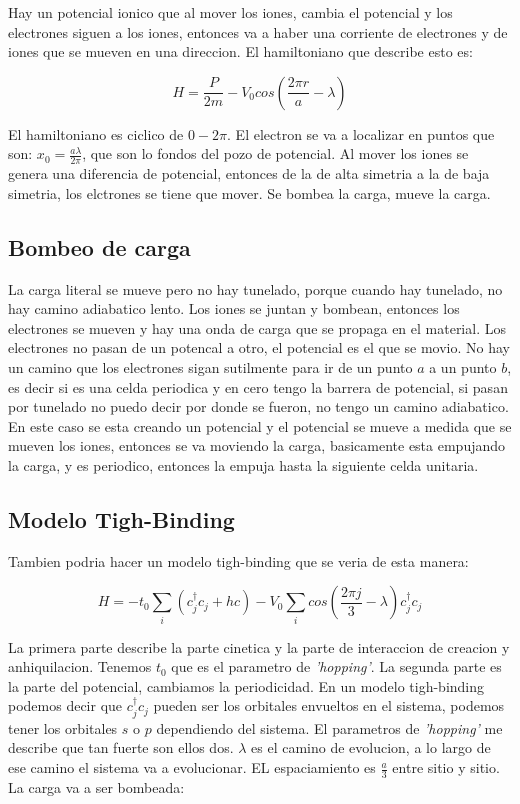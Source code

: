 \documentclass[11pt,fleqn]{book}
\begin{document}
Hay un potencial ionico que al mover los iones, cambia el potencial y los electrones siguen a los iones, entonces va a haber una corriente de electrones y de iones que se mueven en una direccion. El hamiltoniano que describe esto es:

\begin{equation}
    H=\frac{P}{2m}-V_{0}cos\left(\frac{2\pi r}{a}-\lambda\right)
\end{equation}

El hamiltoniano es ciclico de $0-2\pi$. El electron se va a localizar en puntos que son: $x_{0}=\frac{a\lambda}{2\pi}$, que son lo fondos del pozo de potencial. Al mover los iones se genera una diferencia de potencial, entonces de la de alta simetria  a la de baja simetria, los elctrones se tiene que mover. Se bombea la carga, mueve la carga.

\subsection{Bombeo de carga}

La carga literal se mueve pero no hay tunelado, porque  cuando hay tunelado, no hay camino adiabatico lento.  Los iones se juntan y bombean, entonces los electrones se mueven y hay una onda de carga que se propaga en el material. Los electrones no pasan de un potencal a otro, el potencial es el que se movio. No hay un camino que los electrones sigan sutilmente para ir de un punto $a$ a un punto $b$, es decir si es una celda periodica y en cero tengo la barrera de potencial, si pasan por tunelado no puedo decir por donde se fueron, no tengo un camino adiabatico. En este caso se esta creando un potencial y el potencial se mueve a medida que se mueven los iones, entonces se va moviendo la carga, basicamente esta empujando la carga, y es periodico, entonces la empuja hasta la siguiente celda unitaria. 

\subsection{Modelo Tigh-Binding}

Tambien podria hacer un modelo tigh-binding que se veria de esta manera:

\begin{equation}
    H=-t_{0}\sum_{i}(c_{j}^{\dag}c_{j}+hc)-V_{0}\sum_{i}cos\left(\frac{2\pi j}{3}-\lambda\right)c_{j}^{\dag}c_{j}
\end{equation}  

La primera parte describe la parte cinetica y la parte de interaccion de creacion y anhiquilacion. Tenemos $t_{0}$ que es el parametro de \textit{'hopping'}. La segunda parte es la parte del potencial, cambiamos la periodicidad. En un modelo tigh-binding podemos decir que $c_{j}^{\dag}c_{j}$ pueden ser los orbitales envueltos en el sistema, podemos tener los orbitales $s$ o $p$ dependiendo del sistema. El parametros de \textit{'hopping'} me describe que tan fuerte son ellos dos. $\lambda$ es el camino de evolucion, a lo largo de ese camino el sistema va a evolucionar. EL espaciamiento es $\frac{a}{3}$ entre sitio y sitio. La carga va a ser bombeada:
\end{document}
